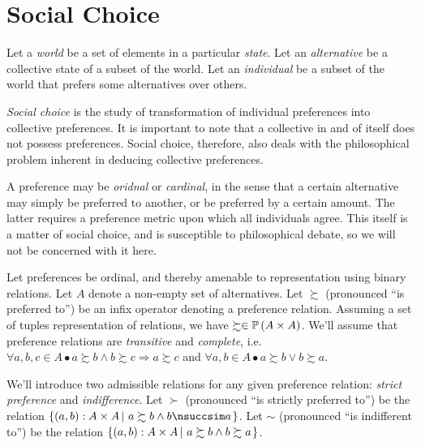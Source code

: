 

\section{Social Choice}

\def\pref{\succsim}
\def\npref{\nsuccsim}
\def\spref{\succ}
\def\nspref{\nsucc}
\def\indif{\sim}
\def\nindif{\nsim}

Let a \emph{world} be a set of elements in a particular \emph{state}. Let an
\emph{alternative} be a collective state of a subset of the world. Let an
\emph{individual} be a subset of the world that prefers some alternatives over
others.

\emph{Social choice} is the study of transformation of individual preferences
into collective preferences. It is important to note that a collective in and
of itself does not possess preferences. Social choice, therefore, also deals
with the philosophical problem inherent in deducing collective preferences.

A preference may be \emph{oridnal} or \emph{cardinal}, in the sense that a
certain alternative may simply be preferred to another, or be preferred by a
certain amount. The latter requires a preference metric upon which all
individuals agree. This itself is a matter of social choice, and is susceptible
to philosophical debate, so we will not be concerned with it here.

Let preferences be ordinal, and thereby amenable to representation using binary
relations. Let $A$ denote a non-empty set of alternatives. Let $\pref$
(pronounced ``is preferred to'') be an infix operator denoting a preference
relation. Assuming a set of tuples representation of relations, we have $\pref
\in \mathbb{P}\p{A\times A}$.  We'll assume that preference relations are
\emph{transitive} and \emph{complete}, i.e.  $\forall a,b,c\in A \bullet a\pref
b \wedge b \pref c \Rightarrow a \pref c$ and $\forall a,b\in A \bullet a \pref
b \vee b \pref a$.

We'll introduce two admissible relations for any given preference relation:
\emph{strict preference} and \emph{indifference}. Let $\spref$ (pronounced ``is
strictly preferred to'') be the relation $\set{\p{a,b} : A \times A \st{a \pref
b \wedge b \npref a}}$. Let $\indif$ (pronounced ``is indifferent to'') be the
relation $\set{\p{a,b} : A \times A \st{a \pref b \wedge b \pref a}}$.


